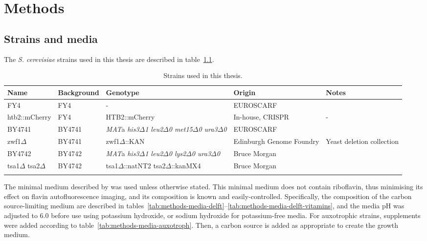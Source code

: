 
\chapter{Methods}
\label{ch:methods}

\section{Strains and media}
\label{sec:methods-strains_media}

The \emph{S. cerevisiae} strains used in this thesis are described in table~\ref{tab:methods-strains}.

\begin{table}
  \footnotesize
  \centering
  \begin{tabularx}{\linewidth}{bbbbb}
    \toprule
    Name & Background & Genotype & Origin & Notes\\
    \midrule
    FY4 & FY4 & - & EUROSCARF & \textcite{winstonConstructionSetConvenient1995} \\
    htb2::mCherry & FY4 & HTB2::mCherry & In-house, CRISPR & - \\
    BY4741 & BY4741 & \emph{MAT}a \emph{his3$\Delta$1 leu2$\Delta$0 met15$\Delta$0 ura3$\Delta$0} & EUROSCARF & \textcite{brachmannDesignerDeletionStrains1998}\\
    zwf1$\Delta$ & BY4741 & zwf1$\Delta$::KAN & Edinburgh Genome Foundry & Yeast deletion collection \\
    BY4742 & BY4742 & \emph{MAT}a \emph{his3$\Delta$1 leu2$\Delta$0 lys2$\Delta$0 ura3$\Delta$0} & Bruce Morgan & \textcite{calabreseHyperoxidationMitochondrialPeroxiredoxin2019}\\
    tsa1$\Delta$ tsa2$\Delta$ & BY4742 & tsa1$\Delta$::natNT2 tsa2$\Delta$::kanMX4 & Bruce Morgan & \textcite{calabreseHyperoxidationMitochondrialPeroxiredoxin2019} \\
    \bottomrule \\
  \end{tabularx}
  \caption{Strains used in this thesis.}
  \label{tab:methods-strains}
\end{table}

The minimal medium described by \parencite{verduynEffectBenzoicAcid1992} was used unless otherwise stated.
This minimal medium does not contain riboflavin, thus minimising its effect on flavin autofluorescence imaging, and its composition is known and easily-controlled.
Specifically, the composition of the carbon source-limiting medium are described in tables~\ref{tab:methods-media-delft}--\ref{tab:methods-media-delft-vitamins}, and the media pH was adjusted to 6.0 before use using potassium hydroxide, or sodium hydroxide for potassium-free media.
For auxotrophic strains, supplements were added according to table~\ref{tab:methods-media-auxotroph}.
Then, a carbon source is added as appropriate to create the growth medium.

